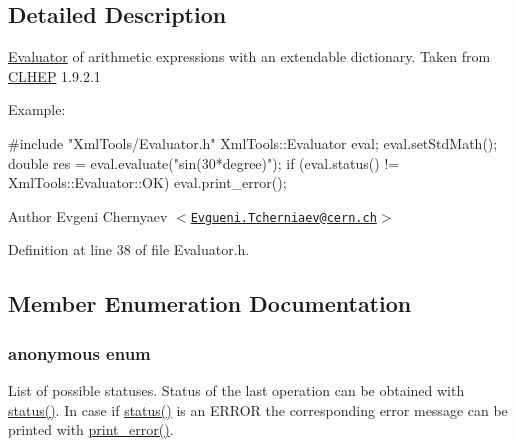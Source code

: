 \subsection{Detailed Description}
\hyperlink{class_xml_tools_1_1_evaluator}{Evaluator} of arithmetic expressions with an extendable dictionary. Taken from \hyperlink{namespace_c_l_h_e_p}{CLHEP} 1.9.2.1

Example: 
\begin{DoxyCode}
   #include "XmlTools/Evaluator.h"
   XmlTools::Evaluator eval;
   eval.setStdMath();
   double res = eval.evaluate("sin(30*degree)");
   if (eval.status() != XmlTools::Evaluator::OK) eval.print_error();
\end{DoxyCode}


\begin{DoxyAuthor}{Author}
Evgeni Chernyaev $<$\href{mailto:Evgueni.Tcherniaev@cern.ch}{\tt Evgueni.Tcherniaev@cern.ch}$>$ 
\end{DoxyAuthor}


Definition at line 38 of file Evaluator.h.

\subsection{Member Enumeration Documentation}
\hypertarget{class_xml_tools_1_1_evaluator_a83556834c4fd68f4836782936cc29a6b}{
\subsubsection[{"@6}]{\setlength{\rightskip}{0pt plus 5cm}anonymous enum}}
\label{class_xml_tools_1_1_evaluator_a83556834c4fd68f4836782936cc29a6b}
List of possible statuses. Status of the last operation can be obtained with \hyperlink{class_xml_tools_1_1_evaluator_a2bb48b05d692c7b2f32d7ef8996ef835}{status()}. In case if \hyperlink{class_xml_tools_1_1_evaluator_a2bb48b05d692c7b2f32d7ef8996ef835}{status()} is an ERROR the corresponding error message can be printed with \hyperlink{class_xml_tools_1_1_evaluator_ad034901d9b832062c7413e698031214e}{print\_\-error()}.

